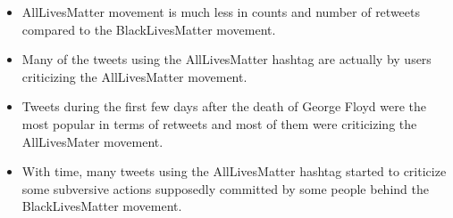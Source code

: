 \begin{itemize}
    \item AllLivesMatter movement is much less in counts and number of retweets compared to the BlackLivesMatter movement.
    \item Many of the tweets using the AllLivesMatter hashtag are actually by users criticizing the AllLivesMatter movement.
    \item Tweets during the first few days after the death of George Floyd were the most popular in terms of retweets and most of them were criticizing the AllLivesMater movement.
    \item With time, many tweets using the AllLivesMatter hashtag started to criticize some subversive actions supposedly committed by some people behind the BlackLivesMatter movement.  
    
 
 
\end{itemize}


